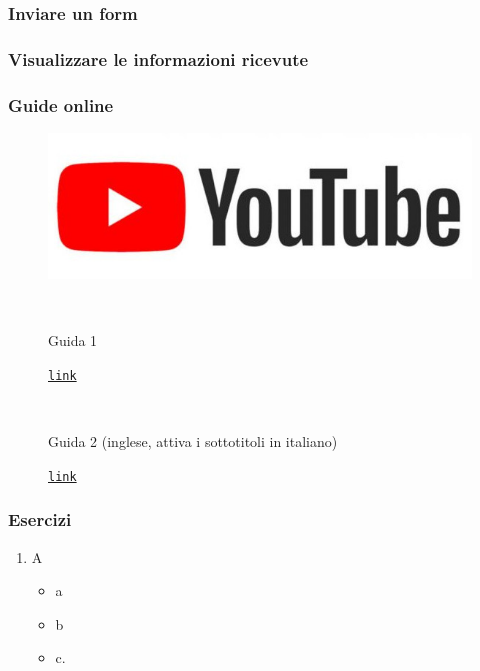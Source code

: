 \documentclass[handout]{beamer}
\begin{document}
\begin{frame}
\frametitle{Inviare un form}

\end{frame}






\begin{frame}
\frametitle{Visualizzare le informazioni ricevute}

\end{frame}




\begin{frame}
\frametitle{Guide online}
\begin{figure}
\includegraphics[width=.5\columnwidth]{img/ytlogo.jpg}

~

Guida 1

\href{link}{\texttt{link}}

~

Guida 2 (inglese, attiva i sottotitoli in italiano)

\href{link}{\texttt{link}}
\end{figure}
\end{frame}



\begin{frame}
\frametitle{Esercizi}
\begin{enumerate}
  \item A
  \begin{itemize}
    \item a
    \item b
    \item c.
  \end{itemize}
\end{enumerate}
\end{frame}
\end{document}
